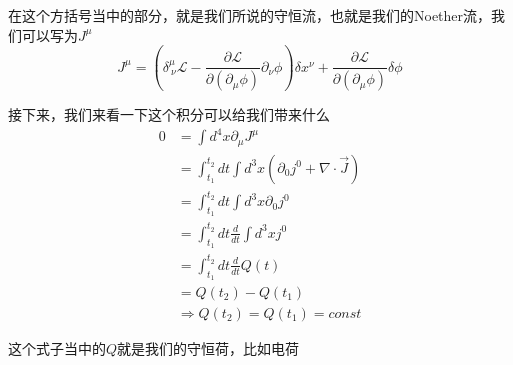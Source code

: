 \documentclass{article}
\begin{document}
在这个方括号当中的部分，就是我们所说的守恒流，也就是我们的Noether流，我们可以写为$J^\mu$
\begin{equation*}
    J^\mu=\left(\delta^\mu_{\ \nu}\mathcal{L}-\frac{\partial\mathcal{L}}{\partial(\partial_\mu\phi)}\partial_\nu\phi\right)\delta x^\nu+\frac{\partial\mathcal{L}}{\partial(\partial_\mu\phi)}\delta\phi
\end{equation*}

接下来，我们来看一下这个积分可以给我们带来什么
\begin{align*}
    0&=\int d^4x\partial_\mu J^\mu\\
    &=\int_{t_1}^{t_2}dt\int d^3x\left(\partial_0j^0+\nabla\cdot\vec{J}\right)\\
    &=\int_{t_1}^{t_2}dt\int d^3x\partial_0j^0\\
    &=\int_{t_1}^{t_2}dt \frac{d}{dt}\int d^3x j^0\\
    &=\int_{t_1}^{t_2}dt \frac{d}{dt}Q(t)\\
    &=Q(t_2)-Q(t_1)\\
    &\Rightarrow Q(t_2)=Q(t_1)=const
\end{align*}

这个式子当中的$Q$就是我们的守恒荷，比如电荷
\end{document}
